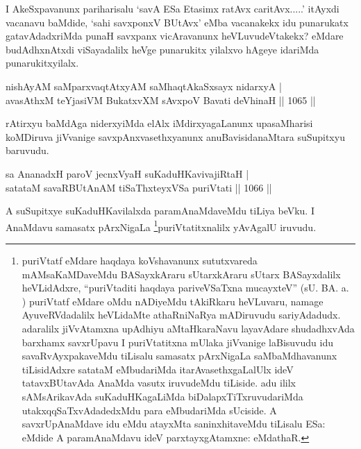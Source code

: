 \begin{artha}
 I AkeSxpavanunx pariharisalu `savA ESa Etasimx ratAvx caritAvx.....' itAyxdi vacanavu baMdide, `sahi savxponxV BUtAvx' eMba vacanakekx idu punarukatx gatavAdadxriMda punaH savxpanx vicAravanunx heVLuvudeVtakekx? eMdare budAdhxnAtxdi viSayadalilx heVge punarukitx yilalxvo hAgeye idariMda punarukitxyilalx.
\end{artha}


\begin{shl}
nishAyAM saMparxvaqtAtxyAM saMhaqtAkaSxsayx nidarxyA | \\
avasAthxM teYjasiVM BukatxvXM sAvxpoV Bavati deVhinaH \hfill||  1065 ||  
\end{shl}

\begin{artha}
rAtirxyu baMdAga niderxyiMda elAlx iMdirxyagaLanunx upasaMharisi koMDiruva jiVvanige savxpAnxvasethxyanunx anuBavisidanaMtara suSupitxyu baruvudu.
\end{artha}

\begin{shl}
sa AnanadxH paroV jecnxVyaH suKaduHKavivajiRtaH | \\
satataM savaRBUtAnAM tiSaThxteyxVSa puriVtati \hfill||  1066 ||  
\end{shl}

\begin{artha}
A suSupitxye suKaduHKavilalxda paramAnaMdaveMdu tiLiya beVku. I AnaMdavu samasatx pArxNigaLa \footnote[1]{puriVtatf eMdare haqdaya koVshavanunx sututxvareda mAMsaKaMDaveMdu BASayxkAraru sUtarxkAraru sUtarx BASayxdalilx heVLidAdxre, ``puriVtaditi haqdaya pariveVSaTxna mucayxteV'' (sU. BA. a. ) puriVtatf eMdare oMdu nADiyeMdu tAkiRkaru heVLuvaru, namage AyuveRVdadalilx heVLidaMte athaRniNaRya mADiruvudu sariyAdadudx. adaralilx jiVvAtamxna upAdhiyu aMtaHkaraNavu layavAdare shudadhxvAda barxhamx savxrUpavu I puriVtatitxna mUlaka jiVvanige laBisuvudu idu savaRvAyxpakaveMdu tiLisalu samasatx pArxNigaLa saMbaMdhavanunx tiLisidAdxre satataM eMbudariMda itarAvasethxgaLalUlx ideV tatavxBUtavAda AnaMda vasutx iruvudeMdu tiLiside. adu ililx sAMsArikavAda suKaduHKagaLiMda biDalapxTiTxruvudariMda utakxqqSaTxvAdadedxMdu para eMbudariMda sUciside. A savxrUpAnaMdave idu eMdu atayxMta saninxhitaveMdu tiLisalu ESa: eMdide A paramAnaMdavu ideV parxtayxgAtamxne: eMdathaR.}puriVtatitxnalilx yAvAgalU iruvudu.
\end{artha}

